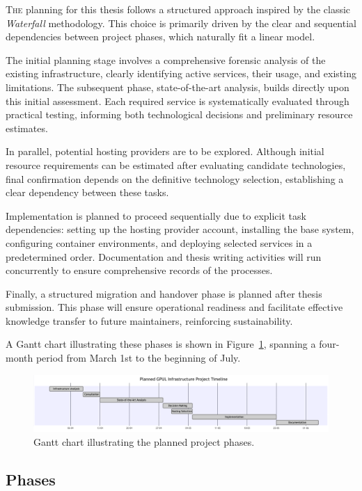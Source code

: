 \lettrine{T}{he} planning for this thesis follows a structured approach inspired by the classic \emph{Waterfall} methodology. This choice is primarily driven by the clear and sequential dependencies between project phases, which naturally fit a linear model.

The initial planning stage involves a comprehensive forensic analysis of the existing infrastructure, clearly identifying active services, their usage, and existing limitations. The subsequent phase, state-of-the-art analysis, builds directly upon this initial assessment. Each required service is systematically evaluated through practical testing, informing both technological decisions and preliminary resource estimates.

In parallel, potential hosting providers are to be explored. Although initial resource requirements can be estimated after evaluating candidate technologies, final confirmation depends on the definitive technology selection, establishing a clear dependency between these tasks.

Implementation is planned to proceed sequentially due to explicit task dependencies: setting up the hosting provider account, installing the base system, configuring container environments, and deploying selected services in a predetermined order. Documentation and thesis writing activities will run concurrently to ensure comprehensive records of the processes.

Finally, a structured migration and handover phase is planned after thesis submission. This phase will ensure operational readiness and facilitate effective knowledge transfer to future maintainers, reinforcing sustainability.

A Gantt chart illustrating these phases is shown in Figure~\ref{fig:gantt-planned}, spanning a four-month period from March 1st to the beginning of July.

\begin{figure}[H]
  \centering
  \includegraphics[width=1\textwidth]{imaxes/gantt-planned.png}
  \caption{Gantt chart illustrating the planned project phases.}
  \label{fig:gantt-planned}
\end{figure}

\subsection*{Phases}

